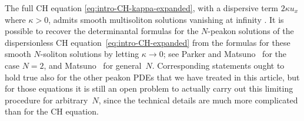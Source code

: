 \documentclass[10pt,a4paper]{article} \pdfoutput=1 
\begin{document}
The full CH equation \eqref{eq:intro-CH-kappa-expanded},
with a dispersive term $2 \kappa u_x$ where $\kappa>0$,
admits smooth multisoliton solutions vanishing at infinity
\cite{parker:2004:CH-direct-method-1,
  parker:2005:CH-direct-method-2,
  parker:2005:CH-direct-method-3,
  matsuno:2005:CH-multisolitons-parametric-representation,
  holm-ivanov:2010:CH-smooth-and-peaked-solitons,
  holm-ivanov:2011:CH-smooth-peaked-solitons-applications,
  ivanov-lyons-orr:2017:CH-solitons-dressing-method}.
It is possible to recover the determinantal formulas for the $N$-peakon solutions of the dispersionless
CH equation~\eqref{eq:intro-CH-expanded}
from the formulas for these smooth $N$-soliton solutions
by letting $\kappa \to 0$;
see Parker and Matsuno~\cite{parker-matsuno:2006:CH-solitons-peakon-limit}
for the case $N=2$,
and Matsuno~\cite{matsuno:2007:CH-multisolitons-peakon-limit} for general~$N$.
Corresponding statements ought to hold true also for the other peakon PDEs
that we have treated in this article,
but for those equations
it is still an open problem to actually carry out this limiting procedure
for arbitrary~$N$,
since the technical details are much more complicated than for the CH equation.
\end{document}
